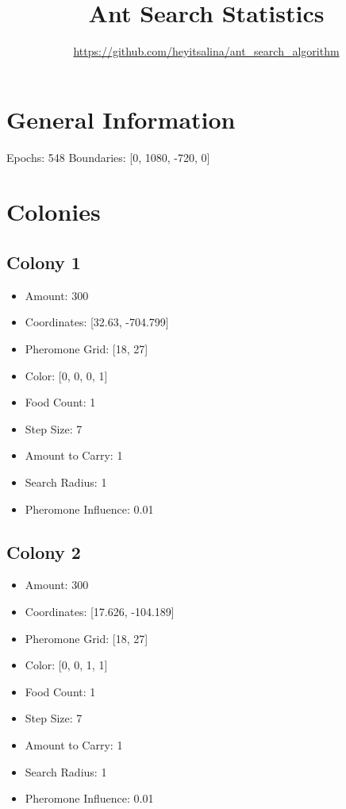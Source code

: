 \documentclass{article}
\begin{document}
    \title{Ant Search Statistics}
    \author{\url{https://github.com/heyitsalina/ant_search_algorithm}}
    \maketitle

    \section{General Information}

    Epochs: 548\newline
Boundaries: [0, 1080, -720, 0]


    \section{Colonies}

    \subsection*{Colony 1}
\begin{itemize}
\item Amount: 300
\item Coordinates: [32.63, -704.799]
\item Pheromone Grid: [18, 27]
\item Color: [0, 0, 0, 1]
\item Food Count: 1
\item Step Size: 7
\item Amount to Carry: 1
\item Search Radius: 1
\item Pheromone Influence: 0.01
\end{itemize}
\subsection*{Colony 2}
\begin{itemize}
\item Amount: 300
\item Coordinates: [17.626, -104.189]
\item Pheromone Grid: [18, 27]
\item Color: [0, 0, 1, 1]
\item Food Count: 1
\item Step Size: 7
\item Amount to Carry: 1
\item Search Radius: 1
\item Pheromone Influence: 0.01
\end{itemize}
\end{document}

